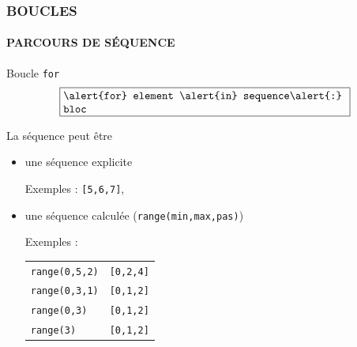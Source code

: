 \begin{frame}
\frametitle{\uppercase{Boucles}}
\framesubtitle{\uppercase{Parcours de séquence}}
\begin{block}{Boucle {\tt for}}
$$\fbox{\begin{minipage}{9cm}\tt 
\alert{for} element \alert{in} sequence\alert{:} bloc
\end{minipage}}$$

La séquence peut être 
\begin{itemize}
\item une séquence explicite

	Exemples : {\tt [5,6,7]},%
\item une séquence calculée ({\tt range(min,max,pas)})

	Exemples : \begin{tabular}[t]{l@{$\rightarrow$}l}
	{\tt range(0,5,2)} & {\tt [0,2,4]} \\%
	{\tt range(0,3,1)} & {\tt [0,1,2]} \\%
	{\tt range(0,3)} & {\tt [0,1,2]} \\%
	{\tt range(3)} & {\tt [0,1,2]}
	\end{tabular}
\end{itemize}
\end{block}

\end{frame}
